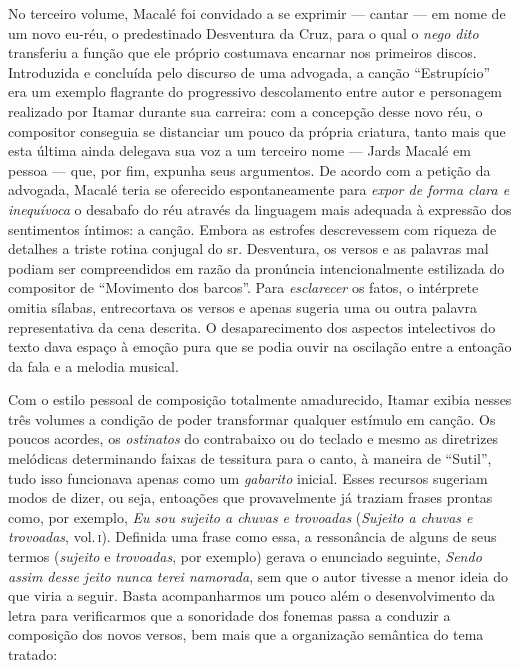 No terceiro volume, Macalé foi convidado a se exprimir --- cantar --- em nome
de um novo eu-réu, o predestinado Desventura da Cruz, para o qual o \textit{nego
dito} transferiu a função que ele próprio costumava encarnar nos
primeiros discos. Introduzida e concluída pelo discurso de uma advogada,
a canção ``Estrupício'' era um exemplo flagrante do progressivo descolamento
entre autor e personagem realizado por Itamar durante sua carreira: com
a concepção desse novo réu, o compositor conseguia se distanciar um
pouco da própria criatura, tanto mais que esta última ainda delegava sua
voz a um terceiro nome --- Jards Macalé em pessoa --- que, por fim, expunha
seus argumentos. De acordo com a petição da advogada, Macalé teria se
oferecido espontaneamente para \textit{expor de forma clara e inequívoca} o
desabafo do réu através da linguagem mais adequada à expressão dos
sentimentos íntimos: a canção. Embora as estrofes descrevessem com
riqueza de detalhes a triste rotina conjugal do sr. Desventura, os
versos e as palavras mal podiam ser compreendidos em razão da pronúncia
intencionalmente estilizada do compositor de ``Movimento dos barcos''. Para
\textit{esclarecer} os fatos, o intérprete omitia sílabas, entrecortava os
versos e apenas sugeria uma ou outra palavra representativa da cena
descrita. O desaparecimento dos aspectos intelectivos do texto dava
espaço à emoção pura que se podia ouvir na oscilação entre a entoação da
fala e a melodia musical.

Com o estilo pessoal de composição totalmente amadurecido, Itamar exibia
nesses três volumes a condição de poder transformar qualquer estímulo em
canção. Os poucos acordes, os \textit{ostinatos} do contrabaixo ou do teclado e
mesmo as diretrizes melódicas determinando faixas de tessitura para o
canto, à maneira de ``Sutil'', tudo isso funcionava apenas como um
\textit{gabarito} inicial. Esses recursos sugeriam modos de dizer, ou seja,
entoações que provavelmente já traziam frases prontas como, por exemplo,
\textit{Eu sou sujeito a chuvas e trovoadas} (\textit{Sujeito a chuvas e trovoadas},
vol.\,\textsc{i}). Definida uma frase como essa, a ressonância de alguns de seus
termos (\textit{sujeito} e \textit{trovoadas}, por exemplo) gerava o enunciado
seguinte, \textit{Sendo assim desse jeito nunca terei namorada}, sem que o
autor tivesse a menor ideia do que viria a seguir. Basta acompanharmos
um pouco além o desenvolvimento da letra para verificarmos que a
sonoridade dos fonemas passa a conduzir a composição dos novos versos,
bem mais que a organização semântica do tema tratado:

